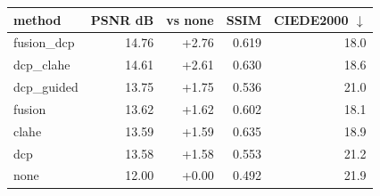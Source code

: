 \begin{tabular}{lrrrr}
\toprule
method & PSNR dB & vs none & SSIM & CIEDE2000 $\downarrow$ \\
\midrule
fusion\_dcp & 14.76 & +2.76 & 0.619 & 18.0 \\
dcp\_clahe & 14.61 & +2.61 & 0.630 & 18.6 \\
dcp\_guided & 13.75 & +1.75 & 0.536 & 21.0 \\
fusion & 13.62 & +1.62 & 0.602 & 18.1 \\
clahe & 13.59 & +1.59 & 0.635 & 18.9 \\
dcp & 13.58 & +1.58 & 0.553 & 21.2 \\
none & 12.00 & +0.00 & 0.492 & 21.9 \\
\bottomrule
\end{tabular}
